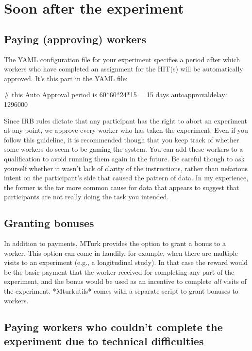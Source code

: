 \documentclass{article}
\newenvironment{code}%
   {\par\noindent\adjustbox{margin=1ex,bgcolor=shadecolor,margin=0ex \medskipamount}\bgroup\minipage\linewidth\verbatim}%
   {\endverbatim\endminipage\egroup}
\begin{document}
\section{Soon after the experiment}

\subsection{Paying (approving) workers}
The YAML configuration file for your experiment specifies a period after which workers who have completed an assignment for the HIT(s) will be automatically approved. It's this part in the YAML file:

\begin{code}
# this Auto Approval period is 60*60*24*15 = 15 days
autoapprovaldelay: 1296000
\end{code}

Since IRB rules dictate that any participant has the right to abort an experiment at any point, we approve every worker who has taken the experiment. Even if you follow this guideline, it is recommended though that you keep track of whether some workers do seem to be gaming the system. You can add these workers to a qualification to avoid running them again in the future. Be careful though to ask yourself whether it wasn't lack of clarity of the instructions, rather than nefarious intent on the participant's side that caused the pattern of data. In my experience, the former is the far more common cause for data that appears to suggest that participants are not really doing the task you intended.

\subsection{Granting bonuses}

In addition to payments, MTurk provides the option to grant a bonus to a worker. This option can come in handily, for example, when there are multiple visits to an experiment (e.g., a longitudinal study). In that case the reward would be the basic payment that the worker received for completing any part of the experiment, and the bonus would be used as an incentive to complete {\em all} visits of the experiment. *Mturkutils* comes with a separate script to grant bonuses to workers.

\subsection{Paying workers who couldn't complete the experiment due to technical difficulties}\label{sec:pay-incomplete}
\end{document}
